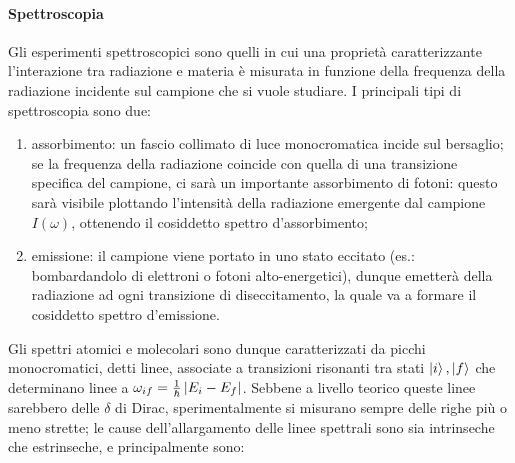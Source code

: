\paragraph{Spettroscopia}

Gli esperimenti spettroscopici sono quelli in cui una proprietà caratterizzante l'interazione tra radiazione e materia è misurata in funzione della frequenza della radiazione incidente sul campione che si vuole studiare. I principali tipi di spettroscopia sono due:
\begin{enumerate}
	\item assorbimento: un fascio collimato di luce monocromatica incide sul bersaglio; se la frequenza della radiazione coincide con quella di una transizione specifica del campione, ci sarà un importante assorbimento di fotoni: questo sarà visibile plottando l'intensità della radiazione emergente dal campione $ I(\omega) $, ottenendo il cosiddetto spettro d'assorbimento;
	\item emissione: il campione viene portato in uno stato eccitato (es.: bombardandolo di elettroni o fotoni alto-energetici), dunque emetterà della radiazione ad ogni transizione di diseccitamento, la quale va a formare il cosiddetto spettro d'emissione.
\end{enumerate}
Gli spettri atomici e molecolari sono dunque caratterizzati da picchi monocromatici, detti linee, associate a transizioni risonanti tra stati $ \ket{i} , \ket{f} $ che determinano linee a $ \omega_{if} = \frac{1}{\hbar} \left\lvert E_i - E_f\right\rvert $. Sebbene a livello teorico queste linee sarebbero delle $ \delta $ di Dirac, sperimentalmente si misurano sempre delle righe più o meno strette; le cause dell'allargamento delle linee spettrali sono sia intrinseche che estrinseche, e principalmente sono:
